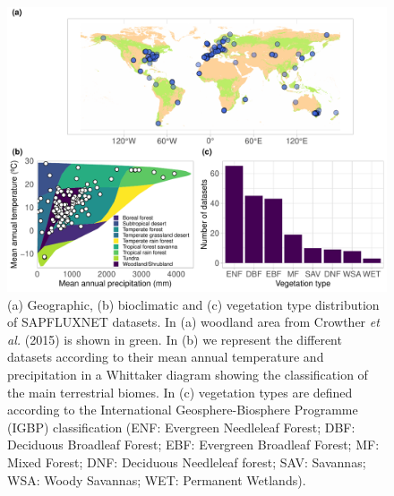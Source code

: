 \documentclass[11pt,twoside]{reedthesis}
\begin{document}
\setlength{\abovecaptionskip}{0pt}
\begin{figure}[H]

{\centering \includegraphics[width=1\linewidth]{figure/CH3/Figure2} 

}

\caption[Geographic, bioclimatic and vegetation type distribution of SAPFLUXNET datasets.]{(a) Geographic, (b) bioclimatic and (c) vegetation type
distribution of SAPFLUXNET datasets. In (a) woodland area from Crowther
\emph{et al.} (2015) is shown in green. In (b) we represent the
different datasets according to their mean annual temperature and
precipitation in a Whittaker diagram showing the classification of the
main terrestrial biomes. In (c) vegetation types are defined according
to the International Geosphere-Biosphere Programme (IGBP) classification
(ENF: Evergreen Needleleaf Forest; DBF: Deciduous Broadleaf Forest; EBF:
Evergreen Broadleaf Forest; MF: Mixed Forest; DNF: Deciduous Needleleaf
forest; SAV: Savannas; WSA: Woody Savannas; WET: Permanent Wetlands).}\label{fig:Ch2plot2}
\end{figure}
\setlength{\abovecaptionskip}{0pt}
\end{document}
